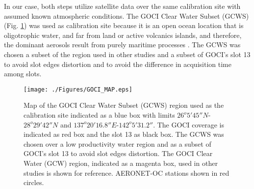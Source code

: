 \documentclass[10pt]{article}
\begin{document}
In our case, both steps utilize satellite data over the same calibration site with assumed known atmospheric conditions.
The GOCI Clear Water Subset (GCWS) (Fig. \ref{fig:GOCI_map}) was used as calibration site because it is an open ocean location that is oligotrophic water, and far from land or active volcanics islands, and therefore, the dominant aerosols result from purely maritime processes \cite{Franz:07}.
The GCWS was chosen a subset of the region used in other studies and a subset of GOCI's slot 13 to avoid slot edges distortion \cite{Kim:2015,Kim:2016} and to avoid the difference in acquisition time among slots.
\begin{figure}[H]
  \centering
  \texttt{[image: ./Figures/GOCI\_MAP.eps]}
    \caption{Map of the GOCI Clear Water Subset (GCWS) region used as the calibration site indicated as a blue box with limits $26^o 5' 45''N$-$28^o 29' 42''N$ and $137^o 20' 16.8''E$-$142^o 5' 31.2''$. The GOCI coverage is indicated as red box and the slot 13 as black box. The GCWS was chosen over a low productivity water region and as a subset of GOCI's slot 13 to avoid slot edges distortion. The GOCI Clear Water (GCW) region, indicated as a magenta box, used in other studies is shown for reference. AERONET-OC stations shown in red circles. \label{fig:GOCI_map}} 
\end{figure}



\end{document}
